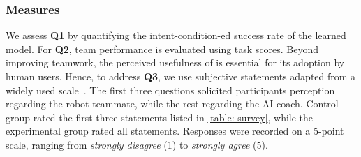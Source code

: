 \subsubsection{Measures}
We assess \textbf{Q1} by quantifying the intent-condition-ed success rate of the learned model. For \textbf{Q2}, team performance is evaluated using task scores. Beyond improving teamwork, the perceived usefulness of \coach is essential for its adoption by human users. Hence, to address \textbf{Q3}, we use subjective statements adapted from a widely used scale~\cite{hoffman2019evaluating}. The first three questions solicited participants perception regarding the robot teammate, while the rest regarding \coach the AI coach. Control group rated the first three statements listed in \cref{table: survey}, while the experimental group rated all statements. Responses were recorded on a 5-point scale, ranging from \textit{strongly disagree} (1) to \textit{strongly agree} (5).
